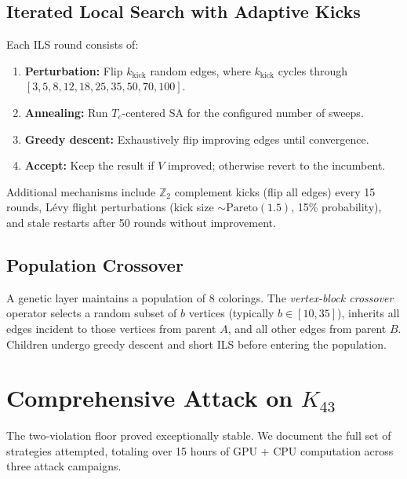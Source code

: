 \documentclass[11pt,a4paper]{article}
\theoremstyle{plain}
\theoremstyle{remark}
\begin{document}
\subsection{Iterated Local Search with Adaptive Kicks}

Each ILS round consists of:
\begin{enumerate}[leftmargin=2em]
  \item \textbf{Perturbation:} Flip $k_{\text{kick}}$ random edges,
    where $k_{\text{kick}}$ cycles through
    $[3, 5, 8, 12, 18, 25, 35, 50, 70, 100]$.
  \item \textbf{Annealing:} Run $T_c$-centered SA for the configured
    number of sweeps.
  \item \textbf{Greedy descent:} Exhaustively flip improving edges
    until convergence.
  \item \textbf{Accept:} Keep the result if $V$ improved; otherwise
    revert to the incumbent.
\end{enumerate}

Additional mechanisms include $\mathbb{Z}_2$ complement kicks (flip
all edges) every 15 rounds, L\'evy flight perturbations
(kick size $\sim \text{Pareto}(1.5)$, 15\% probability), and
stale restarts after 50 rounds without improvement.

\subsection{Population Crossover}

A genetic layer maintains a population of 8 colorings. The
\emph{vertex-block crossover} operator selects a random subset of
$b$ vertices (typically $b \in [10, 35]$), inherits all edges
incident to those vertices from parent $A$, and all other edges from
parent $B$. Children undergo greedy descent and short ILS before
entering the population.

\section{Comprehensive Attack on $K_{43}$}

The two-violation floor proved exceptionally stable. We document
the full set of strategies attempted, totaling over 15 hours of
GPU + CPU computation across three attack campaigns.
\end{document}
